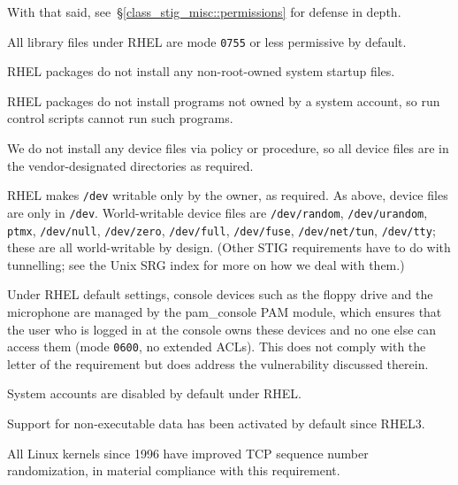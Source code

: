 With that said, see~\S\ref{class_stig_misc::permissions} for defense in depth.

 All library files under RHEL are
mode \verb!0755! or less permissive by default.


 RHEL packages do not install any
non-root-owned system startup files.

 RHEL packages do not install programs not
owned by a system account, so run control scripts cannot run such
programs.

 We do not install any device files via
policy or procedure, so all device files are in the vendor-designated
directories as required.

 RHEL makes \verb!/dev! writable only by the
owner, as required. As above, device files are only in \verb!/dev!.
World-writable device files are \verb!/dev/random!, \verb!/dev/urandom!,
\verb!ptmx!, \verb!/dev/null!, \verb!/dev/zero!, \verb!/dev/full!,
\verb!/dev/fuse!, \verb!/dev/net/tun!, \verb!/dev/tty!; these are all
world-writable by design. (Other STIG requirements have to do with
tunnelling; see the Unix SRG index for more on how we deal with them.)

Under RHEL default settings, console devices such as the floppy drive and
the microphone are managed by the pam\_console PAM module, which ensures
that the user who is logged in at the console owns these devices and no
one else can access them (mode \verb!0600!, no extended ACLs). This does
not comply with the letter of the requirement but does address the
vulnerability discussed therein.

 System accounts are disabled by
default under RHEL.

 Support for non-executable data
has been activated by default since RHEL3.

 All Linux kernels since 1996
have improved TCP sequence number randomization, in material compliance
with this requirement.

